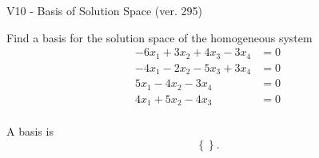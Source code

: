 \begin{exercise}
  \begin{exerciseTitle}V10 - Basis of Solution Space (ver. 295)\end{exerciseTitle}
  \begin{exerciseStatement}
    Find a basis for the solution space of the homogeneous system 
\begin{align*}
 -6 x_ 1 + 3 x_ 2 + 4 x_ 3 -3 x_ 4 &= 0  \\ 
  -4 x_ 1 -2 x_ 2 -5 x_ 3 + 3 x_ 4 &= 0  \\ 
  5 x_ 1 -4 x_ 2 -3 x_ 4 &= 0  \\ 
  4 x_ 1 + 5 x_ 2 -4 x_ 3 &= 0  \\ 
 \end{align*}


 
  \end{exerciseStatement}

  \begin{exerciseAnswer}
   A basis is   
\[\left\{\right\}.\]

  


  \end{exerciseAnswer}
\end{exercise}
